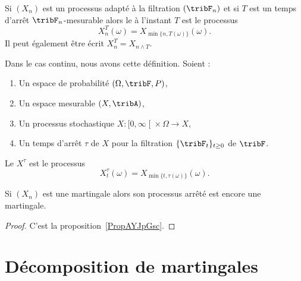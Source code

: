 \begin{definition}
	Si \( (X_n)\) est un processus adapté à la filtration \( (\tribF_n)\) et si \( T\) est un temps d'arrêt \( \tribF_n\)-mesurable alors le  à l'instant \( T\) est le processus
	\begin{equation}
		X_n^T(\omega)=X_{\min\{ n,T(\omega) \}}(\omega).
	\end{equation}
	Il peut également être écrit \( X_n^T=X_{n\wedge T}\).

	Dans le cas continu, nous avons cette définition. Soient :
	\begin{enumerate}
		\item
		      Un espace de probabilité \( (\Omega,\tribF,P)\),
		\item
		      Un espace mesurable \( (X,\tribA)\),
		\item
		      Un processus stochastique  \(X \colon \mathopen[ 0,\infty\mathclose[\times \Omega\to X  \),
		\item
		      Un temps d'arrêt \( \tau\) de \( X\) pour la filtration \( \{ \tribF_t \}_{t\geq 0}\) de \( \tribF\).
	\end{enumerate}
	Le  \( X^{\tau}\) est le processus
	\begin{equation}
		X^{\tau}_t(\omega)=X_{\min\{ t,\tau(\omega) \}}(\omega).
	\end{equation}
\end{definition}

\begin{lemma}	\label{LEMooWTLJooUyMYoV}
	Si \( (X_n)\) est une martingale alors son processus arrêté est encore une martingale.
\end{lemma}

\begin{proof}
	C'est  la proposition~\ref{PropAYJpGsc}.
\end{proof}


\section{Décomposition de martingales}

